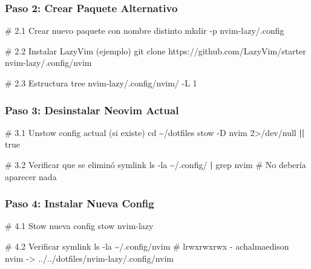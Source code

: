 \documentclass[
  doc,
  floatsintext,
  longtable,
  a4paper,
  nolmodern,
  notxfonts,
  notimes,
  12pt,
  colorlinks=true,linkcolor=blue,citecolor=blue,urlcolor=blue]{apa7}
\newenvironment{Shaded}{\begin{snugshade}}{\end{snugshade}}
\newcommand{\AttributeTok}[1]{\textcolor[rgb]{0.40,0.45,0.13}{#1}}
\newcommand{\BuiltInTok}[1]{\textcolor[rgb]{0.00,0.23,0.31}{#1}}
\newcommand{\CommentTok}[1]{\textcolor[rgb]{0.37,0.37,0.37}{#1}}
\newcommand{\DecValTok}[1]{\textcolor[rgb]{0.68,0.00,0.00}{#1}}
\newcommand{\ExtensionTok}[1]{\textcolor[rgb]{0.00,0.23,0.31}{#1}}
\newcommand{\FunctionTok}[1]{\textcolor[rgb]{0.28,0.35,0.67}{#1}}
\newcommand{\KeywordTok}[1]{\textcolor[rgb]{0.00,0.23,0.31}{\textbf{#1}}}
\newcommand{\NormalTok}[1]{\textcolor[rgb]{0.00,0.23,0.31}{#1}}
\newcommand{\OperatorTok}[1]{\textcolor[rgb]{0.37,0.37,0.37}{#1}}
\begin{document}
\subsubsection{Paso 2: Crear Paquete
Alternativo}\label{paso-2-crear-paquete-alternativo}

\begin{Shaded}
\begin{Highlighting}[]
\CommentTok{\# 2.1 Crear nuevo paquete con nombre distinto}
\FunctionTok{mkdir} \AttributeTok{{-}p}\NormalTok{ nvim{-}lazy/.config}

\CommentTok{\# 2.2 Instalar LazyVim (ejemplo)}
\FunctionTok{git}\NormalTok{ clone https://github.com/LazyVim/starter nvim{-}lazy/.config/nvim}

\CommentTok{\# 2.3 Estructura}
\ExtensionTok{tree}\NormalTok{ nvim{-}lazy/.config/nvim/ }\AttributeTok{{-}L}\NormalTok{ 1}
\end{Highlighting}
\end{Shaded}

\subsubsection{Paso 3: Desinstalar Neovim
Actual}\label{paso-3-desinstalar-neovim-actual}

\begin{Shaded}
\begin{Highlighting}[]
\CommentTok{\# 3.1 Unstow config actual (si existe)}
\BuiltInTok{cd}\NormalTok{ \textasciitilde{}/dotfiles}
\ExtensionTok{stow} \AttributeTok{{-}D}\NormalTok{ nvim }\DecValTok{2}\OperatorTok{\textgreater{}}\NormalTok{/dev/null }\KeywordTok{||} \FunctionTok{true}

\CommentTok{\# 3.2 Verificar que se eliminó symlink}
\FunctionTok{ls} \AttributeTok{{-}la}\NormalTok{ \textasciitilde{}/.config/ }\KeywordTok{|} \FunctionTok{grep}\NormalTok{ nvim}
\CommentTok{\# No debería aparecer nada}
\end{Highlighting}
\end{Shaded}

\subsubsection{Paso 4: Instalar Nueva
Config}\label{paso-4-instalar-nueva-config}

\begin{Shaded}
\begin{Highlighting}[]
\CommentTok{\# 4.1 Stow nueva config}
\ExtensionTok{stow}\NormalTok{ nvim{-}lazy}

\CommentTok{\# 4.2 Verificar symlink}
\FunctionTok{ls} \AttributeTok{{-}la}\NormalTok{ \textasciitilde{}/.config/nvim}
\CommentTok{\# lrwxrwxrwx  {-} achalmaedison nvim {-}\textgreater{} ../../dotfiles/nvim{-}lazy/.config/nvim}
\end{Highlighting}
\end{Shaded}
\end{document}
